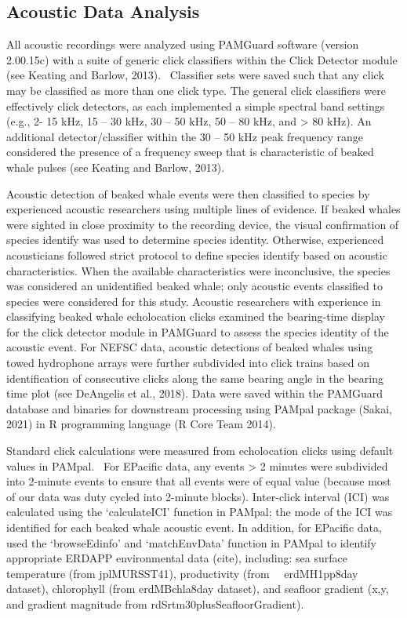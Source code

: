 \documentclass[
  authoryear,
  preprint,
  3p]{elsarticle}
\begin{document}
\hypertarget{acoustic-data-analysis}{%
\subsection{Acoustic Data Analysis}\label{acoustic-data-analysis}}

All acoustic recordings were analyzed using PAMGuard software (version
2.00.15c) with a suite of generic click classifiers within the Click
Detector module (see Keating and Barlow, 2013).~ Classifier sets were
saved such that any click may be classified as more than one click type.
The general click classifiers were effectively click detectors, as each
implemented a simple spectral band settings (e.g., 2- 15 kHz, 15 -- 30
kHz, 30 -- 50 kHz, 50 -- 80 kHz, and \textgreater{} 80 kHz). An
additional detector/classifier within the 30 -- 50 kHz peak frequency
range considered the presence of a frequency sweep that is
characteristic of beaked whale pulses (see Keating and Barlow, 2013).

Acoustic detection of beaked whale events were then classified to
species by experienced acoustic researchers using multiple lines of
evidence. If beaked whales were sighted in close proximity to the
recording device, the visual confirmation of species identify was used
to determine species identity. Otherwise, experienced acousticians
followed strict protocol to define species identify based on acoustic
characteristics. When the available characteristics were inconclusive,
the species was considered an unidentified beaked whale; only acoustic
events classified to species were considered for this study. Acoustic
researchers with experience in classifying beaked whale echolocation
clicks examined the bearing-time display for the click detector module
in PAMGuard to assess the species identity of the acoustic event. For
NEFSC data, acoustic detections of beaked whales using towed hydrophone
arrays were further subdivided into click trains based on identification
of consecutive clicks along the same bearing angle in the bearing time
plot (see DeAngelis et al., 2018). Data were saved within the PAMGuard
database and binaries for downstream processing using PAMpal package
(Sakai, 2021) in R programming language (R Core Team 2014).

Standard click calculations were measured from echolocation clicks using
default values in PAMpal. ~For EPacific data, any events \textgreater{}
2 minutes were subdivided into 2-minute events to ensure that all events
were of equal value (because most of our data was duty cycled into
2-minute blocks). Inter-click interval (ICI) was calculated using the
`calculateICI' function in PAMpal; the mode of the ICI was identified
for each beaked whale acoustic event. In addition, for EPacific data,
used the `browseEdinfo' and `matchEnvData' function in PAMpal to
identify appropriate ERDAPP environmental data (cite), including: sea
surface temperature (from jplMURSST41), productivity (from~
~erdMH1pp8day dataset), chlorophyll (from erdMBchla8day dataset), and
seafloor gradient (x,y, and gradient magnitude from
rdSrtm30plusSeafloorGradient).
\end{document}
